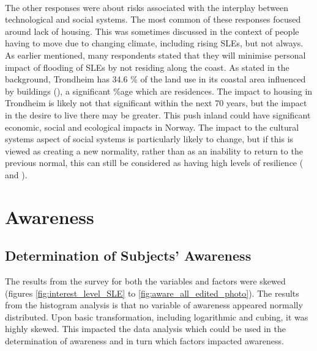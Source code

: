 \paragraph{}
The other responses were about risks associated with the interplay between technological and social systems. The most common of these responses focused around lack of housing. This was sometimes discussed in the context of people having to move due to changing climate, including rising SLEs, but not always.  As earlier mentioned, many respondents stated that they will minimise personal impact of flooding of SLEs by not residing along the coast.  As stated in the background, Trondheim has 34.6 \% of the land use in its coastal area influenced by buildings (\cite{engebakken_construction_2022}), a significant \%age which are residences. The impact to housing in Trondheim is likely not that significant within the next 70 years, but the impact in the desire to live there may be greater. This push inland could have significant economic, social and ecological impacts in Norway. The impact to the cultural systems aspect of social systems is particularly likely to change, but if this is viewed as creating a new normality, rather than as an inability to return to the previous normal, this can still be considered as having high levels of resilience (\cite{cutter_place-based_2008} and \cite{cutter_community_2020}).
\paragraph{}




\section{Awareness} \label{discuss-aware}

\subsection{Determination of Subjects' Awareness}
The results from the survey for both the variables and factors were skewed (figures \ref{fig:interest_level_SLE} to \ref{fig:aware_all_edited_photo}). The results from the histogram analysis is that no variable of awareness appeared normally distributed. Upon basic transformation, including logarithmic and cubing, it was highly skewed. This impacted the data analysis which could be used in the determination of awareness and in turn which factors impacted awareness. 

